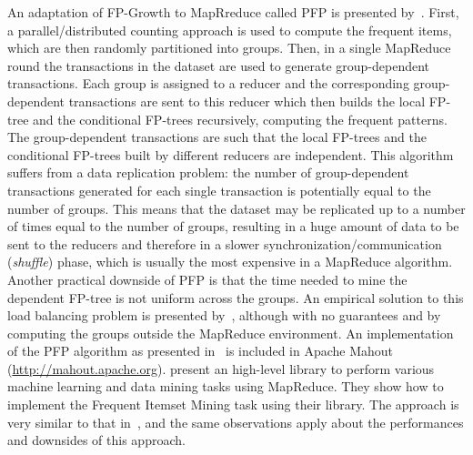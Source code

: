 An adaptation of FP-Growth to MapRreduce called PFP is presented by~\citet{LiWZZC08}. First,
a parallel/distributed counting approach is used to compute the frequent items,
which are then randomly partitioned into groups. Then, in a single MapReduce
round the transactions in the dataset are used to generate group-dependent
transactions. Each group is assigned to a reducer and the corresponding
group-dependent transactions are sent to this reducer which then builds the
local FP-tree and the conditional FP-trees recursively, computing the frequent
patterns. The group-dependent transactions are such that the local FP-trees and
the conditional FP-trees built by different reducers are independent. This
algorithm suffers from a data replication problem: the number of
group-dependent transactions generated for each single transaction is
potentially equal to the number of groups. This means that the dataset may be
replicated up to a number of times equal to the number of groups, resulting in a
huge amount of data to be sent to the reducers and therefore in a slower
synchronization/communication (\emph{shuffle}) phase, which is usually the most
expensive in a MapReduce algorithm.  Another practical downside of PFP is that
the time needed to mine the dependent FP-tree is not uniform across the groups.
An empirical solution to this load balancing problem is presented
by~\citet{ZhouZCLF10}, although with no guarantees and by computing the groups
outside the MapReduce environment. An implementation of the PFP algorithm as
presented in~\citep{LiWZZC08} is included in Apache Mahout
(\url{http://mahout.apache.org}). \citet{GhotingKPK11} present
an high-level library to perform various machine learning and data mining tasks
using MapReduce. They show how to implement the Frequent Itemset Mining task
using their library. The approach is very similar to that in~\citep{LiWZZC08},
and the same observations apply about the performances and downsides of this
approach.

